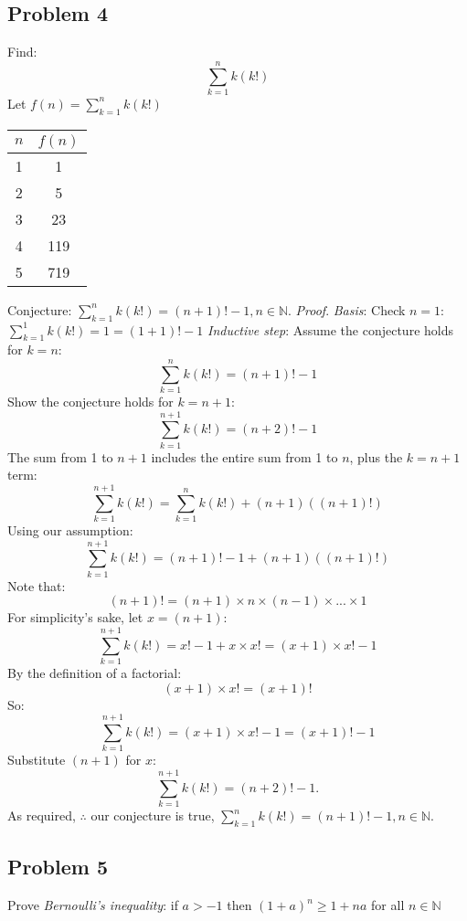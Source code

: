 \documentclass[12pt]{article}
\newcommand{\N}{\mathbb{N}}
\begin{document}
\subsection*{Problem 4}
Find:$$\sum_{k=1}^{n}k\left(k!\right)$$
Let $f\left(n\right)=\sum_{k=1}^{n}k\left(k!\right)$
\begin{center}
    \begin{tabular}{c|c}
    $n$ & $f\left(n\right)$\\
    \hline
    1 & 1\\
    \hline
    2 & 5\\
    \hline
    3 & 23\\
    \hline
    4 & 119\\
    \hline
    5 & 719
    \end{tabular}
\end{center}
Conjecture: $\sum_{k=1}^{n}k\left(k!\right)=\left(n+1\right)!-1, n \in \N$.
\newline\newline\emph{Proof}. \emph{Basis}: Check $n=1$: $\sum_{k=1}^{1}k\left(k!\right)=1=\left(1+1\right)!-1$
\newline \emph{Inductive step}: Assume the conjecture holds for $k=n$: $$\sum_{k=1}^{n}k\left(k!\right)=\left(n+1\right)!-1$$
Show the conjecture holds for $k=n+1$: $$\sum_{k=1}^{n+1}k\left(k!\right)=\left(n+2\right)!-1$$
The sum from 1 to $n+1$ includes the entire sum from 1 to $n$, plus the $k=n+1$ term:$$\sum_{k=1}^{n+1}k\left(k!\right)=\sum_{k=1}^{n}k\left(k!\right)+\left(n+1\right)\left(\left(n+1\right)!\right)$$
Using our assumption:$$\sum_{k=1}^{n+1}k\left(k!\right)=\left(n+1\right)!-1+\left(n+1\right)\left(\left(n+1\right)!\right)$$
Note that:$$\left(n+1\right)!=\left(n+1\right)\times n \times\left(n-1\right)\times...\times1$$
For simplicity's sake, let $x=\left(n+1\right)$:
$$\sum_{k=1}^{n+1}k\left(k!\right)=x!-1+x\times x!=\left(x+1\right)\times x!-1$$
By the definition of a factorial:$$\left(x+1\right)\times x! = \left(x+1\right)!$$ So:$$\sum_{k=1}^{n+1}k\left(k!\right)=\left(x+1\right)\times x!-1=\left(x+1\right)!-1$$Substitute $\left(n+1\right)$ for $x$:$$\sum_{k=1}^{n+1}k\left(k!\right)=\left(n+2\right)!-1.$$
As required, $\therefore$ our conjecture is true, $\sum_{k=1}^{n}k\left(k!\right)=\left(n+1\right)!-1, n \in \N$.
\newpage \subsection*{Problem 5}
Prove \emph{Bernoulli's inequality}: if $a>-1$ then $\left(1+a\right)^n \geq 1+na$ for all $n \in \N$
\end{document}
